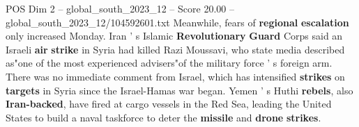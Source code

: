 \begin{textsample}{POS Dim 2 – global\_south\_2023\_12 – Score 20.00 – global\_south\_2023\_12/104592601.txt}
Meanwhile, fears of \textbf{regional} \textbf{escalation} only increased Monday.
Iran ' s Islamic \textbf{Revolutionary} \textbf{Guard} Corps said an Israeli \textbf{air} \textbf{strike} in Syria had killed Razi Moussavi, who state media described as"one of the most experienced advisers"of the military force ' s foreign arm.
There was no immediate comment from Israel, which has intensified \textbf{strikes} on \textbf{targets} in Syria since the Israel-Hamas war began.
Yemen ' s Huthi \textbf{rebels}, also \textbf{Iran-backed}, have fired at cargo vessels in the Red Sea, leading the United States to build a naval taskforce to deter the \textbf{missile} and \textbf{drone} \textbf{strikes}.

\end{textsample}
